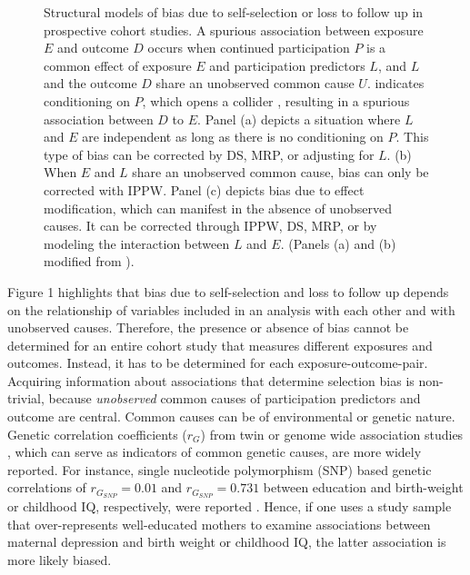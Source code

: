 \documentclass[12pt]{article}
\newcommand*\circled[1]{\tikz[baseline=(char.base)]{
		\node[shape=circle,draw,inner sep=2pt] (char) {#1};}}
\begin{document}
\begin{figure}
	\centering
	
	\caption{Structural models of bias due to self-selection or loss to follow up in prospective cohort studies. A spurious association between exposure $E$ and outcome $D$ occurs when continued participation $P$ is a common effect of exposure $E$ and participation predictors $L$, and $L$ and the outcome $D$ share an unobserved common cause $U$. \protect\circled{$P$} indicates conditioning on $P$, which opens a collider \cite{Cole2010-za}, resulting in a spurious association between $D$ to $E$. Panel (a) depicts a situation where $L$ and $E$ are independent as long as there is no conditioning on $P$. This type of bias can be corrected by DS, MRP, or adjusting for $L$. (b) When $E$ and $L$ share an unobserved common cause, bias can only be corrected with IPPW. Panel (c) depicts bias due to effect modification, which can manifest in the absence of unobserved causes. It can be corrected through IPPW, DS, MRP, or by modeling the interaction between $L$ and $E$. (Panels (a) and (b) modified from \cite{Hernan2004-oz}).}
	\label{fig:SelectionBias}
\end{figure}


Figure 1 highlights that bias due to self-selection and loss to follow up depends on the relationship of variables included in an analysis with each other and with unobserved causes. Therefore, the presence or absence of bias cannot be determined for an entire cohort study that measures different exposures and outcomes. Instead, it has to be determined for each exposure-outcome-pair. Acquiring information about associations that determine selection bias is non-trivial, because \emph{unobserved} common causes of participation predictors and outcome are central. Common causes can be of environmental \cite{Johnson2011-wi,Verweij2013-xk} or genetic nature. Genetic correlation coefficients ($r_G$) from twin\cite{Tambs2012-km} or genome wide association studies \cite{Bulik-Sullivan2015-er}, which can serve as indicators of common genetic causes, are more widely reported. For instance, single nucleotide polymorphism (SNP) based genetic correlations of $r_{G_{SNP}}=0.01$ and $r_{G_{SNP}}=0.731$ between education and birth-weight or childhood IQ, respectively, were reported \cite{Bulik-Sullivan2015-xn}. Hence, if one uses a study sample that over-represents well-educated mothers to examine associations between maternal depression and birth weight or childhood IQ, the latter association is more likely biased.
\end{document}
